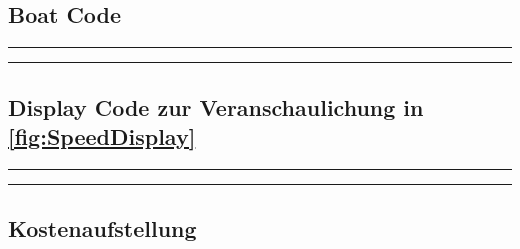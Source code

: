 \documentclass[a4paper,12pt]{article}
\begin{document}
\newpage
\subsection{Boat Code}
\noindent\rule{\linewidth}{0.4pt}  %

\noindent\rule{\linewidth}{0.4pt}  %

\subsection{Display Code zur Veranschaulichung in \ref{fig:SpeedDisplay}}
\noindent\rule{\linewidth}{0.4pt}  %

\noindent\rule{\linewidth}{0.4pt}  %

\newpage



\subsection{Kostenaufstellung}
\end{document}
